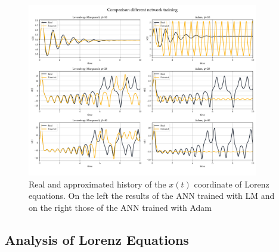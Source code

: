 \documentclass[]{article}
\begin{document}
\begin{figure}[!t]
	\centering
	\includegraphics[width=0.9\textwidth]{../figures/comparison_train.pdf}
	\caption{Real and approximated history of the $x(t)$ coordinate of Lorenz equations. On the left the results of the ANN trained with LM and on the right those of the ANN trained with Adam}
	\label{fig:fig12}
\end{figure}
\subsection{Analysis of Lorenz Equations}
\end{document}
